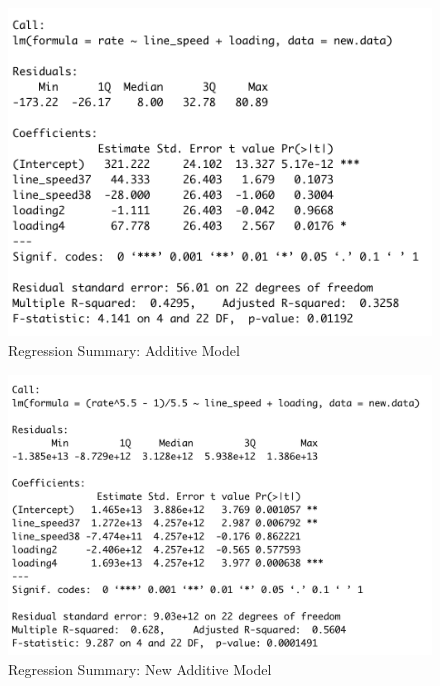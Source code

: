 \documentclass[11pt,a4paper]{article}
\begin{document}
\begin{figure}[htb]
    \centering
    \includegraphics[scale=0.8]{R1}
    \caption{Regression Summary: Additive Model}
    \label{}
\end{figure}
\begin{figure}[htb]
    \centering
    \includegraphics[scale=0.8]{R2}
    \caption{Regression Summary: New Additive Model}
    \label{}
\end{figure}
\end{document}
